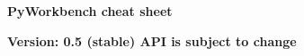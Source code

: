 \documentclass[9pt,landscape]{article}
\begin{document}
\raggedright
\footnotesize

\begin{center}
     \Huge{\textbf{PyWorkbench cheat sheet}} \\
\end{center}

\begin{center}
  \small{\textbf{Version: 0.5 (stable) API is subject to change}} \\
\end{center}

\vspace{-0.15cm}
\noindent\makebox[\linewidth]{\rule{\paperwidth}{2pt}}
\end{document}
